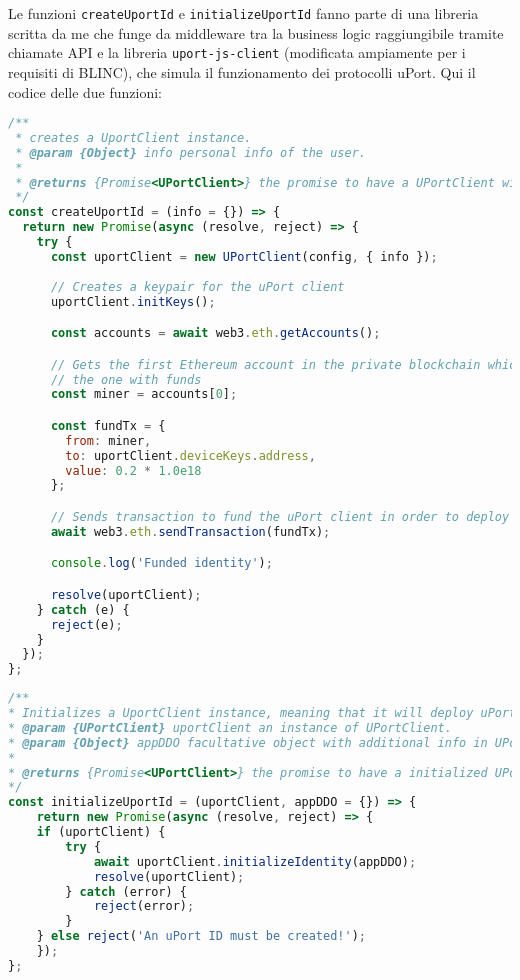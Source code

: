 Le funzioni \texttt{createUportId} e \texttt{initializeUportId} fanno parte di una libreria scritta da me che funge da middleware tra
la business logic raggiungibile tramite chiamate API e la libreria \texttt{uport-js-client} (modificata ampiamente per i requisiti di BLINC),
che simula il funzionamento dei protocolli uPort. Qui il codice delle due funzioni:

\begin{lstlisting}[language=JavaScript]
/**
 * creates a UportClient instance.
 * @param {Object} info personal info of the user.
 *
 * @returns {Promise<UPortClient>} the promise to have a UPortClient with specified infos.
 */
const createUportId = (info = {}) => {
  return new Promise(async (resolve, reject) => {
    try {
      const uportClient = new UPortClient(config, { info });
      
      // Creates a keypair for the uPort client
      uportClient.initKeys();

      const accounts = await web3.eth.getAccounts();

      // Gets the first Ethereum account in the private blockchain which is the one who is mining hence
      // the one with funds  
      const miner = accounts[0];

      const fundTx = {
        from: miner,
        to: uportClient.deviceKeys.address,
        value: 0.2 * 1.0e18
      };

      // Sends transaction to fund the uPort client in order to deploy uPort contracts later
      await web3.eth.sendTransaction(fundTx);

      console.log('Funded identity');

      resolve(uportClient);
    } catch (e) {
      reject(e);
    }
  });
};
\end{lstlisting}

\begin{lstlisting}[language=JavaScript]
/**
* Initializes a UportClient instance, meaning that it will deploy uPort IdentityManager contract, save the DID Document on IPFS and save it on Registry contract.
* @param {UPortClient} uportClient an instance of UPortClient.
* @param {Object} appDDO facultative object with additional info in UPortClient is an instance of a uPort application
*
* @returns {Promise<UPortClient>} the promise to have a initialized UPortClient.
*/
const initializeUportId = (uportClient, appDDO = {}) => {
    return new Promise(async (resolve, reject) => {
    if (uportClient) {
        try {
            await uportClient.initializeIdentity(appDDO);
            resolve(uportClient);
        } catch (error) {
            reject(error);
        }
    } else reject('An uPort ID must be created!');
    });
};
\end{lstlisting}

